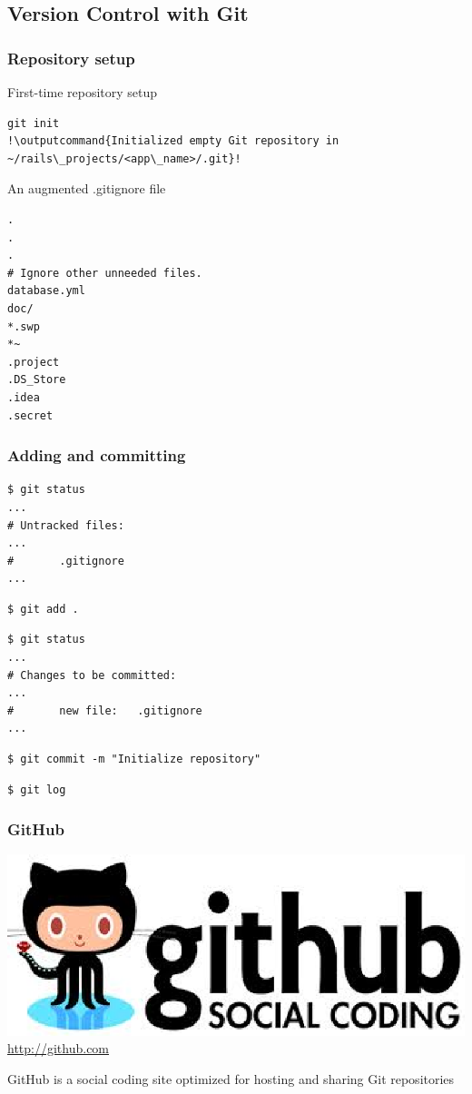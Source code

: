 \documentclass{beamer}
\newcommand{\outputcommand}[1]{\color{darkgreen}{#1}}
\begin{document}
\subsection{Version Control with Git}
\begin{frame}[fragile]
\frametitle{Repository setup}
First-time repository setup
\lstset{language=shell}
\begin{lstlisting}[escapechar=!]
git init
!\outputcommand{Initialized empty Git repository in ~/rails\_projects/<app\_name>/.git}!
\end{lstlisting}
An augmented .gitignore file
\begin{lstlisting}[escapechar=!]
.
.
.
# Ignore other unneeded files.
database.yml
doc/
*.swp
*~
.project
.DS_Store
.idea
.secret
\end{lstlisting}
\end{frame}
\begin{frame}[fragile]
\frametitle{Adding and committing}
\lstset{language=shell}
\begin{lstlisting}[escapechar=!]
$ git status
...
# Untracked files:
...
#       .gitignore
...
\end{lstlisting}
\begin{lstlisting}[escapechar=!]
$ git add .
\end{lstlisting}
\begin{lstlisting}[escapechar=!]
$ git status
...
# Changes to be committed:
...
#       new file:   .gitignore
...
\end{lstlisting}

\begin{lstlisting}[escapechar=!]
$ git commit -m "Initialize repository"
\end{lstlisting}
\begin{lstlisting}[escapechar=!]
$ git log
\end{lstlisting}
\end{frame}
\begin{frame}[fragile]
\frametitle{GitHub}
\href{http://github.com}{\includegraphics[width = 0.50 \textwidth]{github.eps}}\\
\url{http://github.com}

GitHub is a social coding site optimized for hosting and sharing Git repositories
\end{frame}
\end{document}
